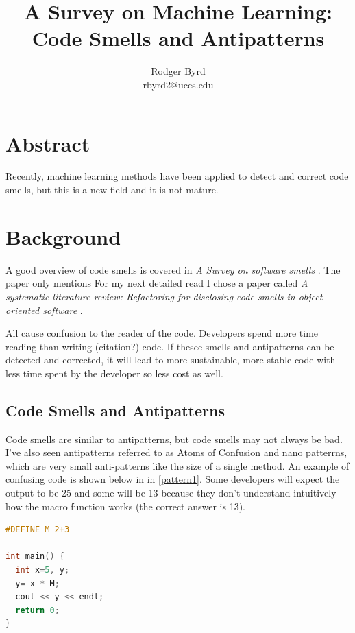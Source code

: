 \documentclass[conference]{IEEEtran}
\begin{document}

\title{A Survey on Machine Learning: Code Smells and Antipatterns}
\author{Rodger Byrd\\rbyrd2@uccs.edu}

\maketitle

\section{Abstract}
Recently, machine learning methods have been applied to detect and correct code smells, but this is a new field and it is not mature.

\section{Background}
A good overview of code smells is covered in \textit{A Survey on software smells} \cite{sharma_survey_2018}. 
The paper only mentions For my next detailed read I chose a paper called  \textit{A systematic literature review: Refactoring for disclosing code smells in object oriented software} \cite{singh_systematic_2018}. 

All cause confusion to the reader of the code. Developers spend more time reading than writing (citation?) code. If thesee smells and antipatterns can be detected and corrected, it will lead to more sustainable, more stable code with less time spent by the developer so less cost as well.

\subsection{Code Smells and Antipatterns}
Code smells are similar to antipatterns, but code smells may not always be bad.
I've also seen antipatterns referred to as Atoms of Confusion \cite{gopstein_understanding_2017} and nano patterrns, which are very small anti-patterns like the size of a single method. 
An example of confusing code is shown below in in \ref{pattern1}.
Some developers will expect the output to be 25 and some will be 13 because they don't understand intuitively how the macro function works (the correct answer is 13).

\begin{lstlisting}[language=C,frame=single,caption=Example Atom of Confusion,label=pattern1]
#DEFINE M 2+3

int main() {
  int x=5, y;
  y= x * M;
  cout << y << endl;
  return 0;
}
\end{lstlisting}
\end{document}
